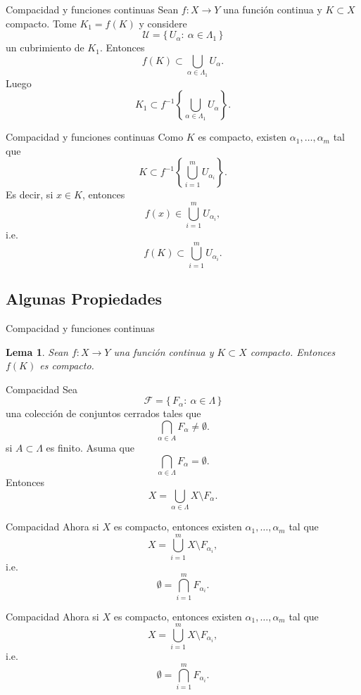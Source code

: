 \documentclass[utf8]{beamer}
\theoremstyle{plain}
\newtheorem{Lem}{Lema}                 %
\theoremstyle{definition}
\theoremstyle{remark}
\numberwithin{equation}{section}
\newcommand{\al}{\alpha}                %
\newcommand{\La}{\Lambda}               %
\newcommand{\cF}{\mathcal{F}}           %
\newcommand{\cU}{\mathcal{U}}           %
\newcommand{\set}[1]{\{\,#1\,\}}    %
\begin{document}
\begin{frame}{Compacidad y funciones continuas}
Sean $f:X \to Y$ una funci\'on continua y $ K \subset X$ compacto. Tome $K_1=f(K)$ y  
considere 
$$\cU=\set{U_\al:\ \al\in\La_1}$$
un cubrimiento de $K_1$. Entonces 
$$ f(K) \subset \bigcup_{\al \in \La_1}U_{\al}.$$
Luego 
$$ K_1 \subset f^{-1}\left\{ \bigcup_{\al \in \La_1}U_{\al}\right\}.$$
\end{frame}

\begin{frame}{Compacidad y funciones continuas}
Como $K$ es compacto, existen $\al_1,\ldots,\al_m$ tal que 
$$ K \subset f^{-1}\left\{ \bigcup_{i=1}^{m}U_{\al_i}\right\}.$$
Es decir, si $x \in K$, entonces 
$$ f(x) \in  \bigcup_{i=1}^{m}U_{\al_i},$$
i.e. 
$$ f(K) \subset \bigcup_{i=1}^{m}U_{\al_i}.$$
\end{frame}

\subsection{Algunas Propiedades}

\begin{frame}{Compacidad y funciones continuas}
  \begin{Lem}\label{lem:CompactosEnCompactos}
    Sean $f:X \to Y$ una funci\'on continua y $ K \subset X$ compacto. Entonces $f(K)$ es compacto.
  \end{Lem}
\end{frame}

\begin{frame}{Compacidad }
Sea 
$$\cF=\set{F_\al:\ \al\in\La}$$
una colecci\'on de conjuntos cerrados tales que 
$$ \bigcap_{\al\in A} F_\al\not= \emptyset.$$
si $A \subset \La$ es finito. Asuma que 
$$ \bigcap_{\al\in \La} F_\al = \emptyset.$$
Entonces 
$$ X = \bigcup_{\al\in \La} X \setminus F_{\al}.$$
\end{frame}

\begin{frame}{Compacidad }
Ahora si $X$ es compacto, entonces existen $\al_1,\ldots,\al_m$ tal que 
$$ X = \bigcup_{i=1}^{m} X \setminus F_{\al_i},$$
i.e. 
$$ \emptyset = \bigcap_{i=1}^{m}  F_{\al_i}.$$
\end{frame}

\begin{frame}{Compacidad }
Ahora si $X$ es compacto, entonces existen $\al_1,\ldots,\al_m$ tal que 
$$ X = \bigcup_{i=1}^{m} X \setminus F_{\al_i},$$
i.e. 
$$ \emptyset = \bigcap_{i=1}^{m}  F_{\al_i}.$$
\end{frame}
\end{document}
